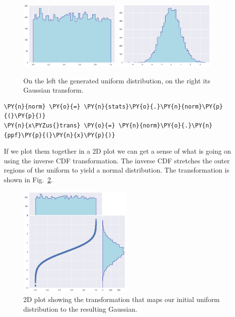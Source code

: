 \begin{figure}[h]
  \centering
  \includegraphics[width=0.45\textwidth]{copula_files/copula_5_0.png}\qquad
  \includegraphics[width=0.45\textwidth]{copula_files/copula_7_0.png}
  \caption{On the left the generated uniform distribution, on the right its Gaussian transform.}
  \label{fig:uniform_and_gauss}
\end{figure}

\begin{tcolorbox}[breakable, size=fbox, boxrule=1pt, pad at break*=1mm,colback=cellbackground, colframe=cellborder]
\begin{Verbatim}[commandchars=\\\{\}]
\PY{n}{norm} \PY{o}{=} \PY{n}{stats}\PY{o}{.}\PY{n}{norm}\PY{p}{(}\PY{p}{)} 
\PY{n}{x\PYZus{}trans} \PY{o}{=} \PY{n}{norm}\PY{o}{.}\PY{n}{ppf}\PY{p}{(}\PY{n}{x}\PY{p}{)}
\end{Verbatim}
\end{tcolorbox}

    If we plot them together in a 2D plot we can get a sense of what is
going on using the inverse CDF transformation.
The inverse CDF stretches the outer regions of the uniform to yield a
normal distribution. The transformation is shown in Fig.~\ref{fig:uniform_to_gauss}. 
    
\begin{figure}[htbp]
  \centering
  \includegraphics[width=0.5\textwidth]{copula_files/copula_9_0.png}
  \caption{2D plot showing the transformation that maps our initial uniform distribution to the resulting Gaussian.}
  \label{fig:uniform_to_gauss}
\end{figure}
    
